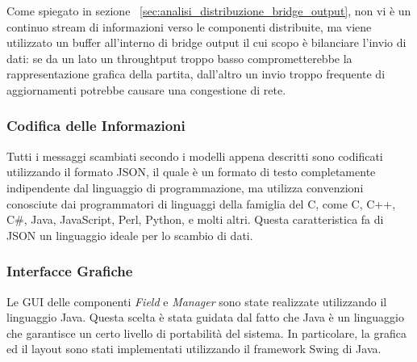 Come spiegato in sezione ~\ref{sec:analisi_distribuzione_bridge_output}, non vi \`{e} un continuo stream di informazioni verso le componenti distribuite, ma viene utilizzato un buffer all'interno di bridge output il cui scopo \`{e} bilanciare l'invio di dati: se da un lato un throughtput troppo basso comprometterebbe la rappresentazione grafica della partita, dall'altro un invio troppo frequente di aggiornamenti potrebbe causare una congestione di rete.

\subsubsection{Codifica delle Informazioni}
Tutti i messaggi scambiati secondo i modelli appena descritti sono codificati utilizzando il formato JSON, il quale \`{e} un formato di testo completamente indipendente dal linguaggio di programmazione, ma utilizza convenzioni conosciute dai programmatori di linguaggi della famiglia del C, come C, C++, C#, Java, JavaScript, Perl, Python, e molti altri. Questa caratteristica fa di JSON un linguaggio ideale per lo scambio di dati.

\subsubsection{Interfacce Grafiche}
Le GUI delle componenti \emph{Field} e \emph{Manager} sono state realizzate utilizzando il linguaggio Java. Questa scelta \`{e} stata guidata dal fatto che Java \`{e} un linguaggio che garantisce un certo livello di portabilit\`{a} del sistema. In particolare, la grafica ed il layout sono stati implementati utilizzando il framework Swing di Java.